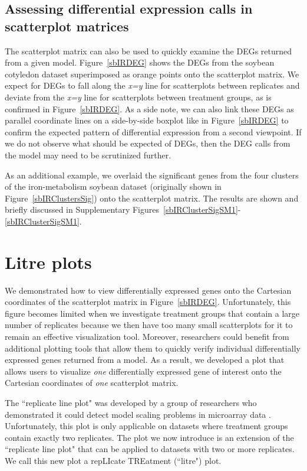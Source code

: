 \documentclass[11pt,a4paper,oldfontcommands,openany]{memoir}
\numberwithin{equation}{section} %
\begin{document}
\subsection{Assessing differential expression calls in scatterplot matrices}

The scatterplot matrix can also be used to quickly examine the DEGs returned from a given model. Figure~\ref{sbIRDEG} shows the DEGs from the soybean cotyledon dataset superimposed as orange points onto the scatterplot matrix. We expect for DEGs to fall along the \textit{x=y} line for scatterplots between replicates and deviate from the \textit{x=y} line for scatterplots between treatment groups, as is confirmed in Figure~\ref{sbIRDEG}. As a side note, we can also link these DEGs as parallel coordinate lines on a side-by-side boxplot like in Figure~\ref{sbIRDEG} to confirm the expected pattern of differential expression from a second viewpoint. If we do not observe what should be expected of DEGs, then the DEG calls from the model may need to be scrutinized further.

As an additional example, we overlaid the significant genes from the four clusters of the iron-metabolism soybean dataset (originally shown in Figure~\ref{sbIRClustersSig}) onto the scatterplot matrix. The results are shown and briefly discussed in Supplementary Figures~\ref{sbIRClusterSigSM1}-\ref{sbIRClusterSigSM1}. 

\section{Litre plots}

We demonstrated how to view differentially expressed genes onto the Cartesian coordinates of the scatterplot matrix in Figure~\ref{sbIRDEG}. Unfortunately, this figure becomes limited when we investigate treatment groups that contain a large number of replicates because we then have too many small scatterplots for it to remain an effective visualization tool. Moreover, researchers could benefit from additional plotting tools that allow them to quickly verify individual differentially expressed genes returned from a model. As a result, we developed a plot that allows users to visualize \textit{one} differentially expressed gene of interest onto the Cartesian coordinates of \textit{one} scatterplot matrix.

The ``replicate line plot" was developed by a group of researchers who demonstrated it could detect model scaling problems in microarray data \citep{Cook}. Unfortunately, this plot is only applicable on datasets where treatment groups contain exactly two replicates. The plot we now introduce is an extension of the ``replicate line plot" that can be applied to datasets with two or more replicates. We call this new plot a repLIcate TREatment (``litre") plot.
\end{document}
